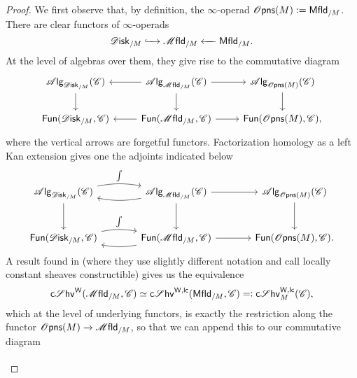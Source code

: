 \documentclass[../text]{subfiles}
\begin{document}
\begin{proof}
    We first observe that, by definition, the $\infty$-operad $\opens(M) := \mfld[r]_{/M}$. There are clear functors of $\infty$-operads
    \begin{equation}
        \disk_{/M} \xhookrightarrow{\ \ \ } \mfld_{/M} \xleftarrow{\ \ \ } \mfld[r]_{/M}.
    \end{equation}
    At the level of algebras over them, they give rise to the commutative diagram
    \begin{equation}
        \begin{tikzcd}
            \alg{\disk_{/M}} (\catC) \arrow[d] & \alg{\mfld_{/M}} (\catC) \arrow[l] \arrow[r] \arrow[d] & \alg{\opens(M)} (\catC) \arrow[d] \\
            \mathsf{Fun}(\disk_{/M}, \catC) & \mathsf{Fun}(\mfld_{/M}, \catC) \arrow[l] \arrow[r] & \mathsf{Fun}(\opens(M), \catC),
        \end{tikzcd}
    \end{equation}
    where the vertical arrows are forgetful functors. Factorization homology as a left Kan extension gives one the adjoints indicated below
    \begin{equation}
        \begin{tikzcd}[row sep = large, column sep = large]
            \alg{\disk_{/M}} (\catC) \arrow[r, bend left=10, "\int"] \arrow[d] & \alg{\mfld_{/M}} (\catC) \arrow[l, bend left=10] \arrow[r] \arrow[d] & \alg{\opens(M)} (\catC) \arrow[d] \\
            \mathsf{Fun}(\disk_{/M}, \catC) \arrow[r, bend left=10, "\int"] & \mathsf{Fun}(\mfld_{/M}, \catC) \arrow[l, bend left=10] \arrow[r] & \mathsf{Fun}(\opens(M), \catC).
        \end{tikzcd}
    \end{equation}
    A result found in \cite[thm.1.2.5]{aft_localstrut} (where they use slightly different notation and call locally constant sheaves constructible) gives us the equivalence
    \begin{equation}
        \csheaves[W](\mfld_{/M}, \catC) \simeq \csheaves[W, lc](\mfld[r]_{/M}, \catC) =: \csheaves[W, lc]_M(\catC),
    \end{equation}
    which at the level of underlying functors, is exactly the restriction along the functor $\opens(M) \xrightarrow{} \mfld_{/M}$, so that we can append this to our commutative diagram
    \begin{equation}
        \begin{tikzcd}[row sep = large, column sep = large]

\end{tikzcd}
\end{equation}
\end{proof}
\end{document}
